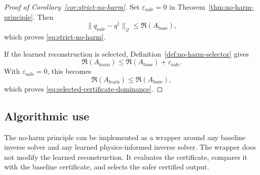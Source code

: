 \documentclass{article}
\numberwithin{equation}{section}
\theoremstyle{definition}
\begin{document}
\begin{proof}[Proof of Corollary~\ref{cor:strict-no-harm}]
Set \(\varepsilon_{\mathrm{safe}}=0\) in Theorem~\ref{thm:no-harm-principle}. Then
\[
\|q_{\mathrm{safe}}-q^\dagger\|_{\mathcal Q}
\le
\mathfrak R(A_{\mathrm{base}}),
\]
which proves \eqref{eq:strict-no-harm}.

If the learned reconstruction is selected, Definition~\ref{def:no-harm-selector} gives
\[
\mathfrak R(A_{\mathrm{learn}})
\le
\mathfrak R(A_{\mathrm{base}})
+
\varepsilon_{\mathrm{safe}}.
\]
With \(\varepsilon_{\mathrm{safe}}=0\), this becomes
\[
\mathfrak R(A_{\mathrm{learn}})
\le
\mathfrak R(A_{\mathrm{base}}),
\]
which proves \eqref{eq:selected-certificate-dominance}.
\end{proof}

\subsection{Algorithmic use}

The no-harm principle can be implemented as a wrapper around any baseline inverse solver and any learned physics-informed inverse solver. The wrapper does not modify the learned reconstruction. It evaluates the certificate, compares it with the baseline certificate, and selects the safer certified output.
\end{document}
